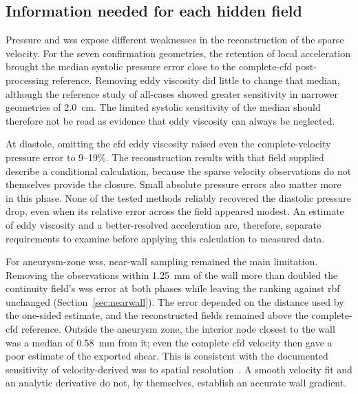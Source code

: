 \documentclass[12pt,a4paper]{article}
\newcommand{\CFD}{\ac{cfd}\xspace}
\newcommand{\WSS}{\ac{wss}\xspace}
\newcommand{\RBF}{\ac{rbf}\xspace}
\theoremstyle{definition}
\numberwithin{equation}{section}
\begin{document}
\subsection{Information needed for each hidden field}
Pressure and \WSS expose different weaknesses in the reconstruction of the sparse velocity. For the seven confirmation geometries, the retention of local acceleration brought the median systolic pressure error close to the complete-\CFD post-processing reference. Removing eddy viscosity did little to change that median, although the reference study of all-cases showed greater sensitivity in narrower geometries of 2.0~cm. The limited systolic sensitivity of the median should therefore not be read as evidence that eddy viscosity can always be neglected.

At diastole, omitting the \CFD eddy viscosity raised even the complete-velocity pressure error to 9--19\%. The reconstruction results with that field supplied describe a conditional calculation, because the sparse velocity observations do not themselves provide the closure. Small absolute pressure errors also matter more in this phase. None of the tested methods reliably recovered the diastolic pressure drop, even when its relative error across the field appeared modest. An estimate of eddy viscosity and a better-resolved acceleration are, therefore, separate requirements to examine before applying this calculation to measured data.

For aneurysm-zone \WSS, near-wall sampling remained the main limitation. Removing the observations within 1.25~mm of the wall more than doubled the continuity field's \WSS error at both phases while leaving the ranking against \RBF unchanged (Section~\ref{sec:nearwall}). The error depended on the distance used by the one-sided estimate, and the reconstructed fields remained above the complete-\CFD reference. Outside the aneurysm zone, the interior node closest to the wall was a median of 0.58~mm from it; even the complete \CFD velocity then gave a poor estimate of the exported shear. This is consistent with the documented sensitivity of velocity-derived \WSS to spatial resolution~\cite{petersson2012assessment,stalder2008quantitative}. A smooth velocity fit and an analytic derivative do not, by themselves, establish an accurate wall gradient.
\end{document}
